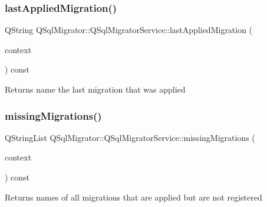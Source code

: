 \subsubsection{\texorpdfstring{last\+Applied\+Migration()}{lastAppliedMigration()}}
{\footnotesize\ttfamily Q\+String Q\+Sql\+Migrator\+::\+Q\+Sql\+Migrator\+Service\+::last\+Applied\+Migration (\begin{DoxyParamCaption}\item[{const \hyperlink{class_q_sql_migrator_1_1_migration_execution_1_1_migration_execution_context}{Migration\+Execution\+::\+Migration\+Execution\+Context} \&}]{context }\end{DoxyParamCaption}) const}

\begin{DoxyReturn}{Returns}
name the last migration that was applied 
\end{DoxyReturn}
\mbox{\label{class_q_sql_migrator_1_1_q_sql_migrator_service_a9d643749c3e565e02532854c2ff35971}} 
\subsubsection{\texorpdfstring{missing\+Migrations()}{missingMigrations()}}
{\footnotesize\ttfamily Q\+String\+List Q\+Sql\+Migrator\+::\+Q\+Sql\+Migrator\+Service\+::missing\+Migrations (\begin{DoxyParamCaption}\item[{const \hyperlink{class_q_sql_migrator_1_1_migration_execution_1_1_migration_execution_context}{Migration\+Execution\+::\+Migration\+Execution\+Context} \&}]{context }\end{DoxyParamCaption}) const}

\begin{DoxyReturn}{Returns}
names of all migrations that are applied but are not registered 
\end{DoxyReturn}
\mbox{\label{class_q_sql_migrator_1_1_q_sql_migrator_service_a438604359cb3fca6636b395976eb2f3c}} 
